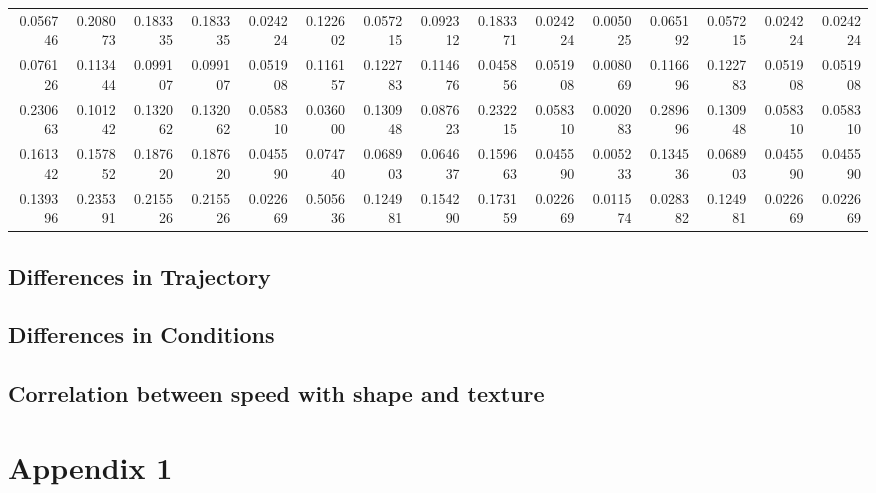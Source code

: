\documentclass{article}
\begin{document}
\begin{landscape}
\begin{table}[htbp]
\begin{tabular}{rrrrrrrrrrrrrrr}
0.056746 & 0.208073 & 0.183335 & 0.183335 & 0.024224 & 0.122602 & 0.057215 & 0.092312 & 0.183371 & 0.024224 & 0.005025 & 0.065192 & 0.057215 & 0.024224 & 0.024224 \\
0.076126 & 0.113444 & 0.099107 & 0.099107 & 0.051908 & 0.116157 & 0.122783 & 0.114676 & 0.045856 & 0.051908 & 0.008069 & 0.116696 & 0.122783 & 0.051908 & 0.051908 \\
0.230663 & 0.101242 & 0.132062 & 0.132062 & 0.058310 & 0.036000 & 0.130948 & 0.087623 & 0.232215 & 0.058310 & 0.002083 & 0.289696 & 0.130948 & 0.058310 & 0.058310 \\
0.161342 & 0.157852 & 0.187620 & 0.187620 & 0.045590 & 0.074740 & 0.068903 & 0.064637 & 0.159663 & 0.045590 & 0.005233 & 0.134536 & 0.068903 & 0.045590 & 0.045590 \\
0.139396 & 0.235391 & 0.215526 & 0.215526 & 0.022669 & 0.505636 & 0.124981 & 0.154290 & 0.173159 & 0.022669 & 0.011574 & 0.028382 & 0.124981 & 0.022669 & 0.022669 \\
\bottomrule
\end{tabular}
\end{table}
\end{landscape}

\subsection*{Differences in Trajectory}
\subsection*{Differences in Conditions}
\subsection*{Correlation between speed with shape and texture}
\section*{Appendix 1}
\end{document}
